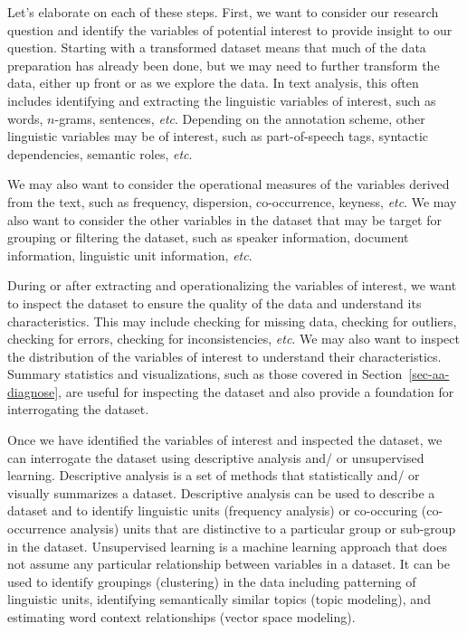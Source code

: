 \documentclass[
  letterpaper,
  DIV=11,
  numbers=noendperiod]{scrreport}
\theoremstyle{definition}
\theoremstyle{remark}
\begin{document}
Let's elaborate on each of these steps. First, we want to consider our
research question and identify the variables of potential interest to
provide insight to our question. Starting with a transformed dataset
means that much of the data preparation has already been done, but we
may need to further transform the data, either up front or as we explore
the data. In text analysis, this often includes identifying and
extracting the linguistic variables of interest, such as words,
\(n\)-grams, sentences, \emph{etc}. Depending on the annotation scheme,
other linguistic variables may be of interest, such as part-of-speech
tags, syntactic dependencies, semantic roles, \emph{etc}.

We may also want to consider the operational measures of the variables
derived from the text, such as frequency, dispersion, co-occurrence,
keyness, \emph{etc}. We may also want to consider the other variables in
the dataset that may be target for grouping or filtering the dataset,
such as speaker information, document information, linguistic unit
information, \emph{etc}.

During or after extracting and operationalizing the variables of
interest, we want to inspect the dataset to ensure the quality of the
data and understand its characteristics. This may include checking for
missing data, checking for outliers, checking for errors, checking for
inconsistencies, \emph{etc}. We may also want to inspect the
distribution of the variables of interest to understand their
characteristics. Summary statistics and visualizations, such as those
covered in Section~\ref{sec-aa-diagnose}, are useful for inspecting the
dataset and also provide a foundation for interrogating the dataset.

Once we have identified the variables of interest and inspected the
dataset, we can interrogate the dataset using descriptive analysis and/
or unsupervised learning. Descriptive analysis is a set of methods that
statistically and/ or visually summarizes a dataset. Descriptive
analysis can be used to describe a dataset and to identify linguistic
units (frequency analysis) or co-occuring (co-occurrence analysis) units
that are distinctive to a particular group or sub-group in the dataset.
Unsupervised learning is a machine learning approach that does not
assume any particular relationship between variables in a dataset. It
can be used to identify groupings (clustering) in the data including
patterning of linguistic units, identifying semantically similar topics
(topic modeling), and estimating word context relationships (vector
space modeling).
\end{document}
